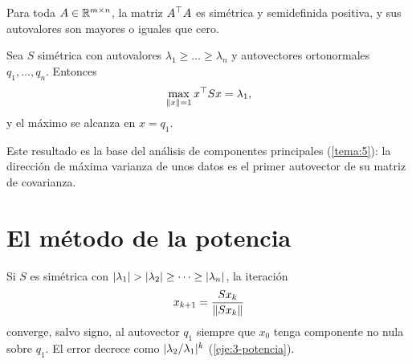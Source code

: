 \begin{proposicion}\label{prop:AtA}
Para toda $A\in\mathbb{R}^{m\times n}$, la matriz $A^{\top} A$ es simétrica y semidefinida positiva, y sus autovalores son mayores o iguales que cero.
\end{proposicion}

\begin{proposicion}\label{prop:rayleigh}
Sea $S$ simétrica con autovalores $\lambda_1\ge\dots\ge\lambda_n$ y autovectores ortonormales $q_1,\dots,q_n$. Entonces
\[
\max_{\lVert x\rVert=1}x^{\top} Sx=\lambda_1,
\]
y el máximo se alcanza en $x=q_1$.
\end{proposicion}

Este resultado es la base del análisis de componentes principales (\cref{tema:5}): la dirección de máxima varianza de unos datos es el primer autovector de su matriz de covarianza.

\section{El método de la potencia}

Si $S$ es simétrica con $\lvert\lambda_1\rvert>\lvert\lambda_2\rvert\ge\dots\ge\lvert\lambda_n\rvert$, la iteración
\[
x_{k+1}=\frac{Sx_k}{\lVert Sx_k\rVert}
\]
converge, salvo signo, al autovector $q_1$ siempre que $x_0$ tenga componente no nula sobre $q_1$. El error decrece como $\lvert\lambda_2/\lambda_1\rvert^{k}$ (\cref{eje:3-potencia}).

\addtocounter{definicion}{1}%

\addtocounter{definicion}{1}%

